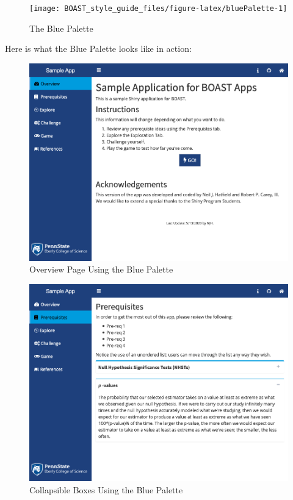 \documentclass[
]{book}
\begin{document}
\begin{figure}

{\centering \texttt{[image: BOAST\_style\_guide\_files/figure-latex/bluePalette-1]} 

}

\caption{The Blue Palette}\label{fig:bluePalette}
\end{figure}

Here is what the Blue Palette looks like in action:

\begin{figure}

{\centering \includegraphics[width=13.26in]{images/blueOverview} 

}

\caption{Overview Page Using the Blue Palette}\label{fig:blueAction1}
\end{figure}

\begin{figure}

{\centering \includegraphics[width=13.26in]{images/blueCollapse} 

}

\caption{Collapsible Boxes Using the Blue Palette}\label{fig:blueAction2}
\end{figure}
\end{document}
